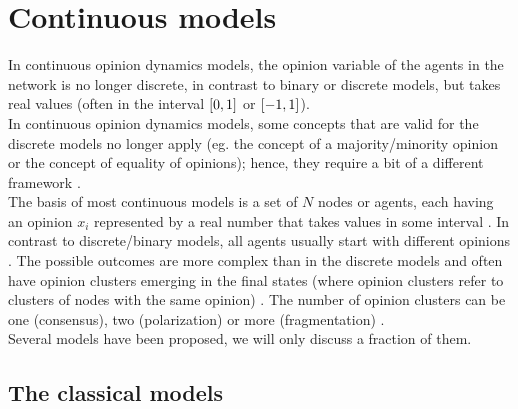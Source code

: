 \documentclass[11 pt , letterpaper , twoside , openright]{book}
\begin{document}
\section{Continuous models}\label{Con}

In continuous opinion dynamics models, the opinion variable of the agents in the network is no longer discrete, in contrast to binary or discrete models, but takes real values (often in the interval $\interval{0}{1}$ or $\interval{-1}{1}$).\\
\newline
In continuous opinion dynamics models, some concepts that are valid for the discrete models no longer apply (eg. the concept of a majority/minority opinion or the concept of equality of opinions); hence, they require a bit of a different framework \cite{Castellano2009}. \\
\newline
The basis of most continuous models is a set of $N$ nodes or agents, each having an opinion $x_i$ represented by a real number that takes values in some interval \cite{Castellano2009}. In contrast to discrete/binary models, all agents usually start with  different opinions \cite{Castellano2009}. The possible outcomes are more complex than in the discrete models and often have opinion clusters emerging in the final states (where opinion clusters refer to clusters of nodes with the same opinion) \cite{Castellano2009}. The number of opinion clusters can be one (consensus), two (polarization) or more (fragmentation) \cite{Castellano2009}. \\
\newline
Several models have been proposed, we will only discuss a fraction of them.

\subsection{The classical models}\label{classMod}
\end{document}
